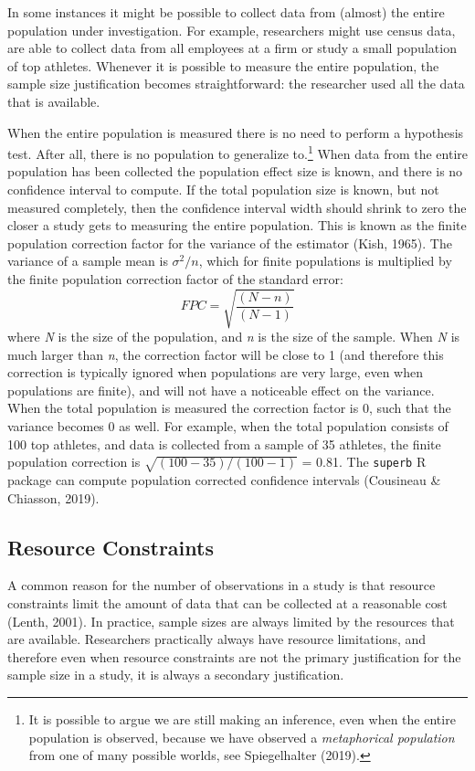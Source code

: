 \documentclass[
  english,
  ,jou,floatsintext]{apa6}
\begin{document}
In some instances it might be possible to collect data from (almost) the entire population under investigation. For example, researchers might use census data, are able to collect data from all employees at a firm or study a small population of top athletes. Whenever it is possible to measure the entire population, the sample size justification becomes straightforward: the researcher used all the data that is available.

When the entire population is measured there is no need to perform a hypothesis test. After all, there is no population to generalize to.\footnote{It is possible to argue we are still making an inference, even when the entire population is observed, because we have observed a \emph{metaphorical population} from one of many possible worlds, see Spiegelhalter (2019).} When data from the entire population has been collected the population effect size is known, and there is no confidence interval to compute. If the total population size is known, but not measured completely, then the confidence interval width should shrink to zero the closer a study gets to measuring the entire population. This is known as the finite population correction factor for the variance of the estimator (Kish, 1965). The variance of a sample mean is \(\sigma^2/n\), which for finite populations is multiplied by the finite population correction factor of the standard error:
\[FPC = \sqrt{\frac{(N - n)}{(N-1)}}\]
where \emph{N} is the size of the population, and \emph{n} is the size of the sample. When \emph{N} is much larger than \emph{n}, the correction factor will be close to 1 (and therefore this correction is typically ignored when populations are very large, even when populations are finite), and will not have a noticeable effect on the variance. When the total population is measured the correction factor is 0, such that the variance becomes 0 as well. For example, when the total population consists of 100 top athletes, and data is collected from a sample of 35 athletes, the finite population correction is \(\sqrt{(100 - 35)/(100-1)}\) = 0.81. The \texttt{superb} R package can compute population corrected confidence intervals (Cousineau \& Chiasson, 2019).

\hypertarget{resource-constraints}{%
\subsection{Resource Constraints}\label{resource-constraints}}

A common reason for the number of observations in a study is that resource constraints limit the amount of data that can be collected at a reasonable cost (Lenth, 2001). In practice, sample sizes are always limited by the resources that are available. Researchers practically always have resource limitations, and therefore even when resource constraints are not the primary justification for the sample size in a study, it is always a secondary justification.
\end{document}
